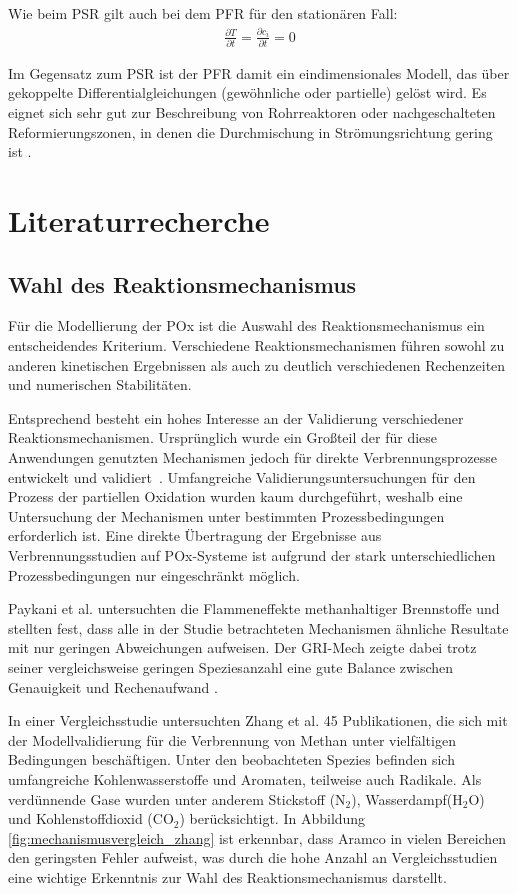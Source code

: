             Wie beim PSR gilt auch bei dem PFR für den stationären Fall: 
            \begin{align}
                \frac{\partial T}{\partial t} = \frac{\partial c_i}{\partial t} = 0
            \end{align}
            
            Im Gegensatz zum PSR ist der PFR damit ein eindimensionales Modell, das über gekoppelte Differentialgleichungen (gewöhnliche oder partielle) gelöst wird. Es eignet sich sehr gut zur Beschreibung von Rohrreaktoren oder nachgeschalteten Reformierungszonen, in denen die Durchmischung in Strömungsrichtung gering ist \cite{Emig_Klemm_2017}. 
    \section{Literaturrecherche}
        \subsection{Wahl des Reaktionsmechanismus}
            \label{sec:reaktionsmechanismen_literatur}
            Für die Modellierung der POx ist die Auswahl des Reaktionsmechanismus ein entscheidendes Kriterium. Verschiedene Reaktionsmechanismen führen sowohl zu anderen kinetischen Ergebnissen als auch zu deutlich verschiedenen Rechenzeiten und nume\-rischen Stabilitäten. 

            Entsprechend besteht ein hohes Interesse an der Validierung verschiedener Reaktions\-mechanismen. Ursprünglich wurde ein Großteil der für diese Anwendungen genutzten Mechanismen jedoch für direkte Verbrennungsprozesse entwickelt und validiert~\cite{MILLER2021100886}. Umfangreiche Validierungsuntersuchungen für den Prozess der partiellen Oxidation wurden kaum durchgeführt, weshalb eine Untersuchung der Mechanismen unter bestimmten Prozessbedingungen erforderlich ist. Eine direkte Übertragung der Ergebnisse aus Verbrennungsstudien auf POx-Systeme ist aufgrund der stark unterschiedlichen Prozessbedingungen nur eingeschränkt möglich.

            Paykani et al. untersuchten die Flammeneffekte methanhaltiger Brennstoffe und stellten fest, dass alle in der Studie betrachteten Mechanismen ähnliche Resultate mit nur geringen Abweichungen aufweisen. Der GRI-Mech zeigte dabei trotz seiner vergleichsweise geringen Speziesanzahl eine gute Balance zwischen Genauigkeit und Rechenaufwand \cite{en14102834}. 

            In einer Vergleichsstudie untersuchten Zhang et al. 45 Publikationen, die sich mit der Modellvalidierung für die Verbrennung von Methan unter vielfältigen Bedingungen beschäftigen. Unter den beobachteten Spezies befinden sich umfangreiche Kohlenwasserstoffe und Aromaten, teilweise auch Radikale. Als verdünnende Gase wurden unter anderem Stickstoff (N$_2$), Wasserdampf(H$_2$O) und Kohlenstoffdioxid (CO$_2$) berücksichtigt. In Abbildung \ref{fig:mechanismusvergleich_zhang} ist erkennbar, dass Aramco in vielen Bereichen den geringsten Fehler aufweist, was durch die hohe Anzahl an Vergleichsstudien eine wichtige Erkenntnis zur Wahl des Reaktionsmechanismus darstellt. 

